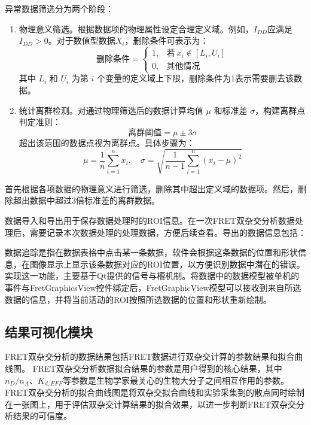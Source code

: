 异常数据筛选分为两个阶段：
\begin{enumerate}
    \item 物理意义筛选。根据数据项的物理属性设定合理定义域。例如，$I_{DD}$应满足 $I_{DD} > 0$。对于数值型数据$X_i$，删除条件可表示为：
    \begin{equation}
    \text{删除条件} = \begin{cases} 
      1, & \text{若} \ x_i \notin [L_i, U_i] \\
      0, & \text{其他情况}
    \end{cases}
    \end{equation}
   其中 $L_i$ 和 $U_i$ 为第 $i$ 个变量的定义域上下限，删除条件为1表示需要删去该数据。
   \item 统计离群检测。对通过物理筛选后的数据计算均值 $\mu$ 和标准差 $\sigma$，构建离群点判定准则：
   \begin{equation}
       \text{离群阈值} = \mu \pm 3\sigma
   \end{equation}
   超出该范围的数据点视为离群点。具体步骤为：
   \begin{equation}
          \mu = \frac{1}{n}\sum_{i=1}^n x_i, \quad \sigma = \sqrt{\frac{1}{n-1}\sum_{i=1}^n (x_i - \mu)^2}
   \end{equation}

\end{enumerate}
首先根据各项数据的物理意义进行筛选，删除其中超出定义域的数据项。然后，删除超出数据中超过3倍标准差的离群数据。

数据导入和导出用于保存数据处理时的ROI信息。在一次FRET双杂交分析数据处理后，需要记录本次数据处理的处理数据，方便后续查看。导出的数据信息包括：

数据追踪是指在数据表格中点击某一条数据，软件会根据这条数据的位置和形状信息，在图像显示上显示该条数据对应的ROI位置，以方便识别数据中潜在的错误。实现这一功能，主要基于Qt提供的信号与槽机制。将数据中的数据模型被单机的事件与FretGraphicsView控件绑定后，FretGraphicView模型可以接收到来自所选数据的信息，并将当前活动的ROI按照所选数据的位置和形状重新绘制。

\subsection{结果可视化模块}
\ifshowtext
FRET双杂交分析的数据结果包括FRET数据进行双杂交计算的参数结果和拟合曲线图。
FRET双杂交分析数据拟合结果的参数是用户得到的核心结果，其中$n_D/n_A$、$K_{d,EFF}$等参数是生物学家最关心的生物大分子之间相互作用的参数。
FRET双杂交分析的拟合曲线图是将双杂交拟合曲线和实验采集到的散点同时绘制在一张图上，用于评估双杂交计算结果的拟合效果，以进一步判断FRET双杂交分析结果的可信度。

